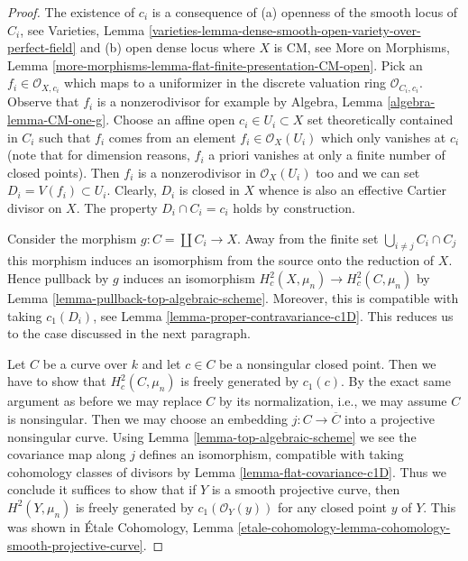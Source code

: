 \begin{proof}
The existence of $c_i$ is a consequence of (a) openness of the smooth
locus of $C_i$, see Varieties, Lemma
\ref{varieties-lemma-dense-smooth-open-variety-over-perfect-field} and
(b) open dense locus where $X$ is CM, see
More on Morphisms, Lemma
\ref{more-morphisms-lemma-flat-finite-presentation-CM-open}.
Pick an $f_i \in \mathcal{O}_{X, c_i}$ which maps to a uniformizer
in the discrete valuation ring $\mathcal{O}_{C_i, c_i}$.
Observe that $f_i$ is a nonzerodivisor for example by
Algebra, Lemma \ref{algebra-lemma-CM-one-g}.
Choose an affine open $c_i \in U_i \subset X$ set theoretically
contained in $C_i$ such that $f_i$ comes from an element
$f_i \in \mathcal{O}_X(U_i)$ which only vanishes at $c_i$ (note that for
dimension reasons, $f_i$ a priori vanishes at only a finite number
of closed points). Then $f_i$ is a nonzerodivisor in $\mathcal{O}_X(U_i)$
too and we can set $D_i = V(f_i) \subset U_i$.
Clearly, $D_i$ is closed in $X$ whence is also an effective Cartier
divisor on $X$. The property $D_i \cap C_i = c_i$ holds by construction.

\medskip\noindent
Consider the morphism $g : C = \coprod C_i \to X$. Away from the finite
set $\bigcup_{i \not = j} C_i \cap C_j$ this morphism induces an
isomorphism from the source onto the reduction of $X$.
Hence pullback by $g$ induces an isomorphism
$H^2_c(X, \mu_n) \to H^2_c(C, \mu_n)$ by
Lemma \ref{lemma-pullback-top-algebraic-scheme}.
Moreover, this is compatible with taking $c_1(D_i)$, see
Lemma \ref{lemma-proper-contravariance-c1D}.
This reduces us to the case discussed in the next paragraph.

\medskip\noindent
Let $C$ be a curve over $k$ and let $c \in C$ be a nonsingular closed
point. Then we have to show that $H^2_c(C, \mu_n)$ is freely generated by
$c_1(c)$. By the exact same argument as before we may replace $C$
by its normalization, i.e., we may assume $C$ is nonsingular.
Then we may choose an embedding $j : C \to \overline{C}$ into a projective
nonsingular curve. Using Lemma \ref{lemma-top-algebraic-scheme}
we see the covariance map along $j$ defines an isomorphism, compatible
with taking cohomology classes of divisors by
Lemma \ref{lemma-flat-covariance-c1D}. Thus we conclude it suffices
to show that if $Y$ is a smooth projective curve, then
$H^2(Y, \mu_n)$ is freely generated by $c_1(\mathcal{O}_Y(y))$ for
any closed point $y$ of $Y$. This was shown in
\'Etale Cohomology, Lemma
\ref{etale-cohomology-lemma-cohomology-smooth-projective-curve}.
\end{proof}

